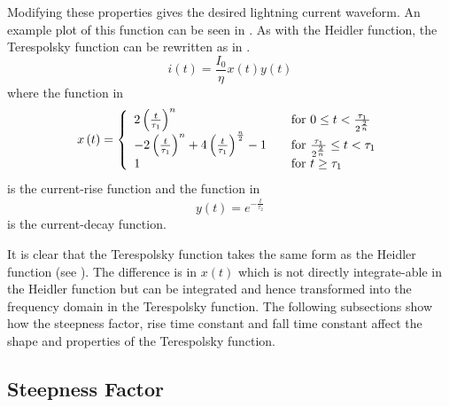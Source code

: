Modifying these properties gives the desired lightning current waveform. An example plot of this function can be seen in .
As with the Heidler function, the Terespolsky function can be rewritten as in .
\begin{equation}
i(t) = \frac{I_0}{\eta} x \left( t \right) y \left( t \right)
\label{eqn:TFSmall}
\end{equation}
where the function in 
\begin{equation}
    x \left( t \right) = \left\{
      \begin{array}{l l}
        2 \left( \frac{t}{\tau_1} \right )^n & \quad \textrm{for $0 \leq t < \frac{\tau_1}{2^{\frac{2}{n}}}$} \\
        -2 \left( \frac{t}{\tau_1} \right )^n +4 \left( \frac{t}{\tau_1} \right )^{\frac{n}{2}} -1 & \quad \textrm{for $\frac{\tau_1}{2^{\frac{2}{n}}} \leq t < \tau_1$} \\
        1 & \quad \textrm{for $t \geq \tau_1$}
      \end{array} \right.
    \label{eqn:TFrise}
\end{equation}
is the current-rise function and the function in 
\begin{equation}
    y \left( t \right) = e^{-\frac{t}{\tau_2}}
    \label{eqn:TFfall}
\end{equation}
is the current-decay function.

It is clear that the Terespolsky function takes the same form as the Heidler function (see ). The difference is in $x \left( t \right)$ which is not directly integrate-able in the Heidler function but can be integrated and hence transformed into the frequency domain in the Terespolsky function. The following subsections show how the steepness factor, rise time constant and fall time constant affect the shape and properties of the Terespolsky function.

\subsection{Steepness Factor}
\label{sub:steepness_factor}

